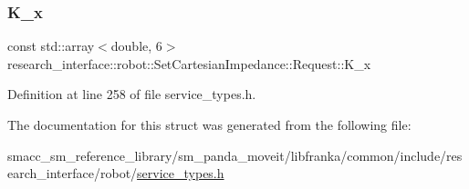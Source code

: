 \subsubsection{\texorpdfstring{K\+\_\+x}{K\_x}}
{\footnotesize\ttfamily const std\+::array$<$double, 6$>$ research\+\_\+interface\+::robot\+::\+Set\+Cartesian\+Impedance\+::\+Request\+::\+K\+\_\+x}



Definition at line 258 of file service\+\_\+types.\+h.



The documentation for this struct was generated from the following file\+:\begin{DoxyCompactItemize}
\item 
smacc\+\_\+sm\+\_\+reference\+\_\+library/sm\+\_\+panda\+\_\+moveit/libfranka/common/include/research\+\_\+interface/robot/\hyperlink{service__types_8h}{service\+\_\+types.\+h}\end{DoxyCompactItemize}
